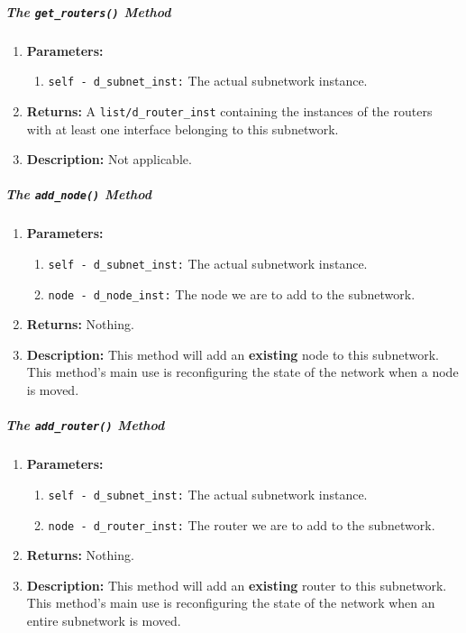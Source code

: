         \subparagraph{The \texttt{get\_routers()} Method}
            \begin{enumerate}
                \item \textbf{Parameters:}
                \begin{enumerate}
                    \item \texttt{self - d\_subnet\_inst:} The actual subnetwork instance.
                \end{enumerate}
                \item \textbf{Returns:} A \texttt{list/d\_router\_inst} containing the instances of the routers with at least one interface belonging to this subnetwork.
                \item \textbf{Description:} Not applicable.
            \end{enumerate}

        \subparagraph{The \texttt{add\_node()} Method}
            \begin{enumerate}
                \item \textbf{Parameters:}
                \begin{enumerate}
                    \item \texttt{self - d\_subnet\_inst:} The actual subnetwork instance.
                    \item \texttt{node - d\_node\_inst:} The node we are to add to the subnetwork.
                \end{enumerate}
                \item \textbf{Returns:} Nothing.
                \item \textbf{Description:} This method will add an \textbf{existing} node to this subnetwork. This method's main use is reconfiguring the state of the network when a node is moved.
            \end{enumerate}

        \subparagraph{The \texttt{add\_router()} Method}
            \begin{enumerate}
                \item \textbf{Parameters:}
                \begin{enumerate}
                    \item \texttt{self - d\_subnet\_inst:} The actual subnetwork instance.
                    \item \texttt{node - d\_router\_inst:} The router we are to add to the subnetwork.
                \end{enumerate}
                \item \textbf{Returns:} Nothing.
                \item \textbf{Description:} This method will add an \textbf{existing} router to this subnetwork. This method's main use is reconfiguring the state of the network when an entire subnetwork is moved.
            \end{enumerate}

